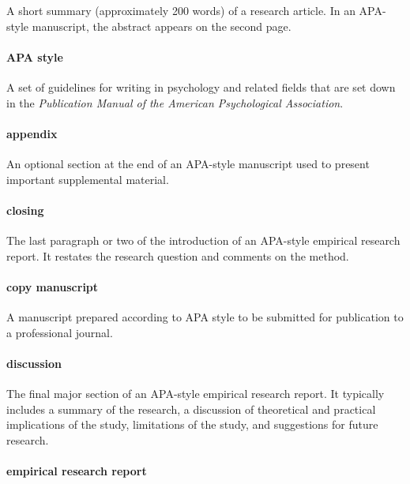 \documentclass[
]{krantz}
\begin{document}
A short summary (approximately 200 words) of a research article. In an APA-style manuscript, the abstract appears on the second page.

\paragraph*{APA style}\label{apa-style}

A set of guidelines for writing in psychology and related fields that are set down in the \emph{Publication Manual of the American Psychological Association}.

\paragraph*{appendix}\label{appendix}

An optional section at the end of an APA-style manuscript used to present important supplemental material.

\paragraph*{closing}\label{closing}

The last paragraph or two of the introduction of an APA-style empirical research report. It restates the research question and comments on the method.

\paragraph*{copy manuscript}\label{copy-manuscript}

A manuscript prepared according to APA style to be submitted for publication to a professional journal.

\paragraph*{discussion}\label{discussion-1}

The final major section of an APA-style empirical research report. It typically includes a summary of the research, a discussion of theoretical and practical implications of the study, limitations of the study, and suggestions for future research.

\paragraph*{empirical research report}\label{empirical-research-report-1}
\end{document}
